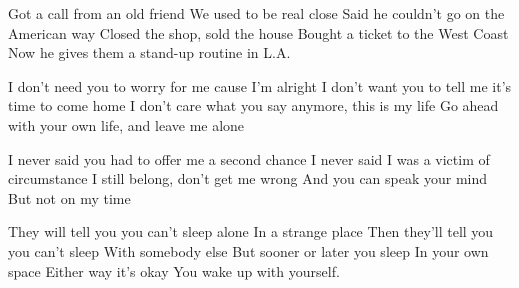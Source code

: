 Got a call from an old friend 
We used to be real close 
Said he couldn't go on the American way 
Closed the shop, sold the house 
Bought a ticket to the West Coast 
Now he gives them a stand-up routine in L.A. 

I don't need you to worry for me cause I'm alright 
I don't want you to tell me it's time to come home 
I don't care what you say anymore, this is my life 
Go ahead with your own life, and leave me alone 

I never said you had to offer me a second chance 
I never said I was a victim of circumstance 
I still belong, don't get me wrong 
And you can speak your mind 
But not on my time 

They will tell you you can't sleep alone 
In a strange place 
Then they'll tell you you can't sleep 
With somebody else 
But sooner or later you sleep 
In your own space 
Either way it's okay 
You wake up with yourself.
